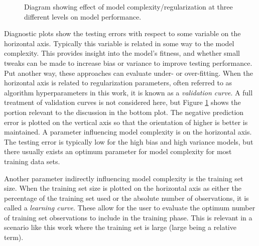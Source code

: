 \begin{figure}[!htb]
  \centering
  \caption[Diagram of model performance with respect to model complexity]
          {Diagram showing effect of model complexity/regularization at three 
           different levels on model performance.}
  \label{fig:complex}
\end{figure}

Diagnostic plots show the testing errors with respect to some variable on the
horizontal axis.  Typically this variable is related in some way to the model
complexity. This provides insight into the model's fitness, and whether small
tweaks can be made to increase bias or variance to improve testing performance.
Put another way, these approaches can evaluate under- or over-fitting.  When
the horizontal axis is related to regularization parameters, often referred to
as algorithm hyperparameters in this work, it is known as a \textit{validation
curve}. A full treatment of validation curves is not considered here, but
Figure \ref{fig:complex} shows the portion relevant to the discussion in the
bottom plot.  The negative prediction error is plotted on the vertical axis
so that the orientation of higher is better is maintained.  A parameter
influencing model complexity is on the horizontal axis.  The testing error is
typically low for the high bias and high variance models, but there usually
exists an optimum parameter for model complexity for most training data sets. 

Another parameter indirectly influencing model complexity is the training set
size.  When the training set size is plotted on the horizontal axis as either
the percentage of the training set used or the absolute number of observations,
it is called a \textit{learning curve}.  These allow for the user to evaluate
the optimum number of training set observations to include in the training
phase.  This is relevant in a scenario like this work where the training set is
large (large being a relative term).  

